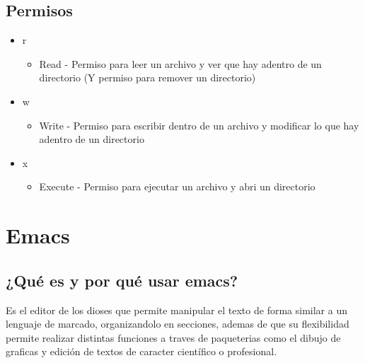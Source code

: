 \documentclass[11pt,letterpaper]{article}
\begin{document}
  \subsection{Permisos}
  \begin{itemize}
    
  \item r
    \begin{itemize}
    \item Read - Permiso para leer un archivo y ver que hay adentro de un directorio (Y permiso para remover un directorio)
    \end {itemize}
    
  \item w
    \begin {itemize}
    \item Write - Permiso para escribir dentro de un archivo y modificar lo que hay adentro de un directorio
    \end {itemize}
    
  \item x
    \begin {itemize}
    \item Execute - Permiso para ejecutar un archivo y abri un directorio
    \end {itemize}
  \end {itemize}

  
\section{Emacs}
\subsection{¿Qué es y por qué usar emacs?}
Es el editor de los dioses que permite manipular el texto de forma similar a un lenguaje de marcado, organizandolo en secciones, ademas de que su flexibilidad permite realizar distintas funciones a traves de paqueterias como el dibujo de graficas y edición de textos de caracter científico o profesional.
\end{document}
